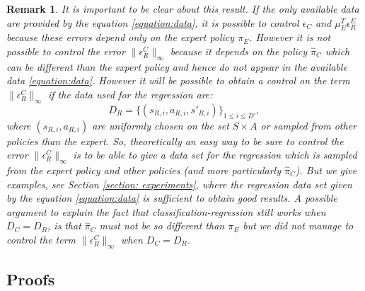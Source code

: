 \documentclass{article} %
\newtheorem{remark}{Remark}
\newcommand{\0}{\mathbf{0}}
\newcommand{\1}{\mathbf{1}}
\begin{document}
\begin{remark}
It is important to be clear about this result. If the only available data are provided by the equation \eqref{equation:data}, it is possible to control
$\epsilon_C$ and $\mu_E^T\epsilon^E_R$ because these errors depend only on the expert policy $\pi_E$. However it is not possible to control the error $\|\epsilon^C_R\|_{\infty}$
because it depends on the policy $\hat{\pi}_C$ which can be different than the expert policy and hence do not appear in the available data \eqref{equation:data}. However
it will be possible to obtain a control on the term $\|\epsilon^C_R\|_{\infty}$ if the data used for the regression are:
\begin{equation}
D_R=\{(s_{R,i},a_{R,i},s'_{R,i})\}_{1\leq i \leq D'},
\end{equation}
where $(s_{R,i},a_{R,i})$ are uniformly chosen on the set $S\times A$ or sampled from other policies than the expert. So, theoretically an easy way to be sure
to control the error $\|\epsilon^C_R\|_{\infty}$ is to be able to give a data set for the regression which is sampled from the expert policy and other policies (and more particularly $\hat{\pi}_C$). But we give examples, see Section \ref{section: experiments}, where the regression data set given by the equation \eqref{equation:data} is sufficient to obtain good results.
A possible argument to explain the fact that classification-regression still works when $D_C=D_R$, is that $\hat{\pi}_C$ must not be so different than $\pi_E$ but we did not manage to control
the term $\|\epsilon^C_R\|_{\infty}$ when $D_C=D_R$.
\end{remark}
\subsection{Proofs}
\end{document}
